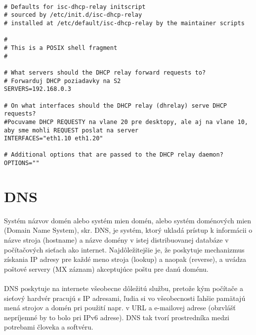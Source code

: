 \noindent
{\selectfont

\begin{small}

\begin{verbatim}

# Defaults for isc-dhcp-relay initscript
# sourced by /etc/init.d/isc-dhcp-relay
# installed at /etc/default/isc-dhcp-relay by the maintainer scripts

#
# This is a POSIX shell fragment
#

# What servers should the DHCP relay forward requests to?
# Forwarduj DHCP poziadavky na S2
SERVERS=192.168.0.3

# On what interfaces should the DHCP relay (dhrelay) serve DHCP requests?
#Pocuvame DHCP REQUESTY na vlane 20 pre desktopy, ale aj na vlane 10, aby sme mohli REQUEST poslat na server
INTERFACES="eth1.10 eth1.20"

# Additional options that are passed to the DHCP relay daemon?
OPTIONS=""

\end{verbatim}

\end{small}

}

\section{DNS}
\paragraph{}
Systém názvov domén alebo systém mien domén, alebo systém doménových mien (Domain Name System), skr. DNS, je systém, ktorý ukladá prístup k informácii o názve stroja (hostname) a názve domény v istej distribuovanej databáze v počítačových sieťach ako internet. Najdôležitejšie je, že poskytuje mechanizmus získania IP adresy pre každé meno stroja (lookup) a naopak (reverse), a uvádza poštové servery (MX záznam) akceptujúce poštu pre danú doménu.
\paragraph{}
DNS poskytuje na internete všeobecne dôležitú službu, pretože kým počítače a sieťový hardvér pracujú s IP adresami, ľudia si vo všeobecnosti ľahšie pamätajú mená strojov a domén pri použití napr. v URL a e-mailovej adrese (obzvlášť nepríjemné by to bolo pri IPv6 adrese). DNS tak tvorí prostredníka medzi potrebami človeka a softvéru.
